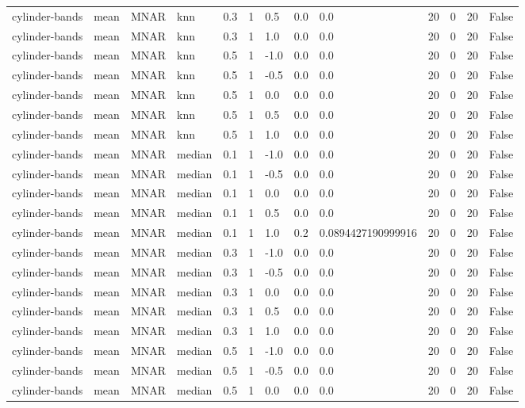 \begin{tabular}{lllllllllllll}
cylinder-bands & mean & MNAR & knn & 0.3 & 1 & 0.5 & 0.0 & 0.0 & 20 & 0 & 20 & False \\
cylinder-bands & mean & MNAR & knn & 0.3 & 1 & 1.0 & 0.0 & 0.0 & 20 & 0 & 20 & False \\
cylinder-bands & mean & MNAR & knn & 0.5 & 1 & -1.0 & 0.0 & 0.0 & 20 & 0 & 20 & False \\
cylinder-bands & mean & MNAR & knn & 0.5 & 1 & -0.5 & 0.0 & 0.0 & 20 & 0 & 20 & False \\
cylinder-bands & mean & MNAR & knn & 0.5 & 1 & 0.0 & 0.0 & 0.0 & 20 & 0 & 20 & False \\
cylinder-bands & mean & MNAR & knn & 0.5 & 1 & 0.5 & 0.0 & 0.0 & 20 & 0 & 20 & False \\
cylinder-bands & mean & MNAR & knn & 0.5 & 1 & 1.0 & 0.0 & 0.0 & 20 & 0 & 20 & False \\
cylinder-bands & mean & MNAR & median & 0.1 & 1 & -1.0 & 0.0 & 0.0 & 20 & 0 & 20 & False \\
cylinder-bands & mean & MNAR & median & 0.1 & 1 & -0.5 & 0.0 & 0.0 & 20 & 0 & 20 & False \\
cylinder-bands & mean & MNAR & median & 0.1 & 1 & 0.0 & 0.0 & 0.0 & 20 & 0 & 20 & False \\
cylinder-bands & mean & MNAR & median & 0.1 & 1 & 0.5 & 0.0 & 0.0 & 20 & 0 & 20 & False \\
cylinder-bands & mean & MNAR & median & 0.1 & 1 & 1.0 & 0.2 & 0.0894427190999916 & 20 & 0 & 20 & False \\
cylinder-bands & mean & MNAR & median & 0.3 & 1 & -1.0 & 0.0 & 0.0 & 20 & 0 & 20 & False \\
cylinder-bands & mean & MNAR & median & 0.3 & 1 & -0.5 & 0.0 & 0.0 & 20 & 0 & 20 & False \\
cylinder-bands & mean & MNAR & median & 0.3 & 1 & 0.0 & 0.0 & 0.0 & 20 & 0 & 20 & False \\
cylinder-bands & mean & MNAR & median & 0.3 & 1 & 0.5 & 0.0 & 0.0 & 20 & 0 & 20 & False \\
cylinder-bands & mean & MNAR & median & 0.3 & 1 & 1.0 & 0.0 & 0.0 & 20 & 0 & 20 & False \\
cylinder-bands & mean & MNAR & median & 0.5 & 1 & -1.0 & 0.0 & 0.0 & 20 & 0 & 20 & False \\
cylinder-bands & mean & MNAR & median & 0.5 & 1 & -0.5 & 0.0 & 0.0 & 20 & 0 & 20 & False \\
cylinder-bands & mean & MNAR & median & 0.5 & 1 & 0.0 & 0.0 & 0.0 & 20 & 0 & 20 & False \\

\end{tabular}

